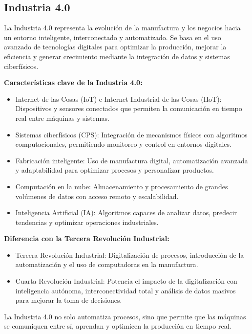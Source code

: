 \documentclass[a4paper,oneside,11pt]{article}
\begin{document}
\newpage

\subsection{Industria 4.0}

La Industria 4.0 representa la evolución de la manufactura y los negocios hacia un entorno inteligente, interconectado y automatizado. Se basa en el uso avanzado de tecnologías digitales para optimizar la producción, mejorar la eficiencia y generar crecimiento mediante la integración de datos y sistemas ciberfísicos.

\textbf{Características clave de la Industria 4.0:}

\begin{itemize}
    \item Internet de las Cosas (IoT) e Internet Industrial de las Cosas (IIoT): Dispositivos y sensores conectados que permiten la comunicación en tiempo real entre máquinas y sistemas.
    \item Sistemas ciberfísicos (CPS): Integración de mecanismos físicos con algoritmos computacionales, permitiendo monitoreo y control en entornos digitales.
    \item Fabricación inteligente: Uso de manufactura digital, automatización avanzada y adaptabilidad para optimizar procesos y personalizar productos.
    \item Computación en la nube: Almacenamiento y procesamiento de grandes volúmenes de datos con acceso remoto y escalabilidad.
    \item Inteligencia Artificial (IA): Algoritmos capaces de analizar datos, predecir tendencias y optimizar operaciones industriales.
\end{itemize}

\textbf{Diferencia con la Tercera Revolución Industrial:}
\begin{itemize}
    \item Tercera Revolución Industrial: Digitalización de procesos, introducción de la automatización y el uso de computadoras en la manufactura.
    \item Cuarta Revolución Industrial: Potencia el impacto de la digitalización con inteligencia autónoma, interconectividad total y análisis de datos masivos para mejorar la toma de decisiones.
\end{itemize}
La Industria 4.0 no solo automatiza procesos, sino que permite que las máquinas se comuniquen entre sí, aprendan y optimicen la producción en tiempo real. 
\end{document}
